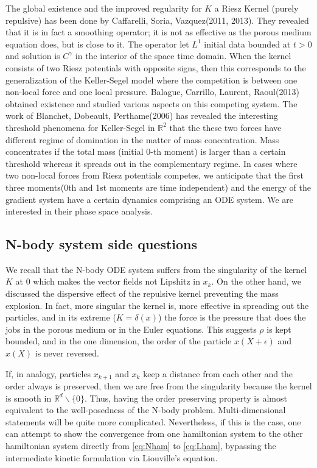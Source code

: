 \documentclass[a4paper,11pt]{article}
\begin{document}
\begin{enumerate}
 The global existence and the improved regularity for $K$ a Riesz Kernel (purely repulsive) has been done by Caffarelli, Soria, Vazquez(2011, 2013). They revealed that it is in fact a smoothing operator; it is not as effective as the porous medium equation does, but is close to it. The operator let $L^1$ initial data bounded at $t>0$ and solution is $C^\gamma$ in the interior of the space time domain. When the kernel consists of two Riesz potentials with opposite signs, then this corresponds to the generalization of the Keller-Segel model where the competition is between one non-local force and one local pressure. Balague, Carrillo, Laurent, Raoul(2013) obtained existence and studied various aspects on this competing system. The work of Blanchet, Dobeault, Perthame(2006) has revealed the interesting threshold phenomena for Keller-Segel in $\mathbb{R}^2$ that the these two forces have different regime of domination in the matter of mass concentration. Mass concentrates if the total mass (initial 0-th moment) is larger than a certain threshold whereas it spreads out in the complementary regime. In cases where two non-local forces from Riesz potentials competes, we anticipate that the first three moments(0th and 1st moments are time independent) and the energy of the gradient system have a certain dynamics comprising an ODE system. We are interested in their phase space analysis. 
\end{enumerate}
\vspace{-2em}
\subsection*{N-body system side questions}
We recall that the N-body ODE system suffers from the singularity of the kernel $K$ at $0$ which makes the vector fields not Lipshitz in $x_k$. On the other hand, we discussed the dispersive effect of the repulsive kernel preventing the mass explosion. In fact, more singular the kernel is, more effective in spreading out the particles, and in its extreme ($K=\delta(x)$) the force is the pressure that does the jobs in the porous medium or in the Euler equations. This suggests $\rho$ is kept bounded, and in the one dimension, the order of the particle $x(X+\epsilon)$ and $x(X)$ is never reversed. 

If, in analogy, particles $x_{k+1}$ and $x_{k}$ keep a distance from each other and the order always is preserved, then we are free from the singularity because the kernel is smooth in $ \mathbb{R}^d \backslash \{0\}$. Thus, having the order preserving property is almost equivalent to the well-posedness of the N-body problem. Multi-dimensional statements will be quite more complicated. Nevertheless, if this is the case, one can attempt to show the convergence from one hamiltonian system to the other hamiltonian system directly from \eqref{eq:Nham} to \eqref{eq:Lham}, bypassing the intermediate kinetic formulation via Liouville's equation. 
\end{document}
